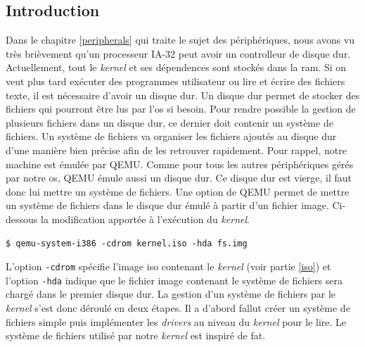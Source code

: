 
\subsection{Introduction}
Dans le chapitre \ref{peripherals} qui traite le sujet des périphériques, nous
avons vu très brièvement qu'un processeur \acrshort{IA-32} peut avoir un controlleur
de disque dur. Actuellement, tout le \textit{kernel} et ses dépendences sont
stockés dans la \acrshort{ram}. Si on veut plus tard exécuter des programmes utilisateur
ou lire et écrire des fichiers texte, il est nécessaire d'avoir un disque dur.
Un disque dur permet de stocker des fichiers qui pourront être lus par l'\acrshort{os}
si besoin. Pour rendre possible la gestion de plusieurs fichiers dans un disque
dur, ce dernier doit contenir un système de fichiers. Un système de fichiers va
organiser les fichiers ajoutés au disque dur d'une manière bien précise afin
de les retrouver rapidement. Pour rappel, notre machine est émulée par QEMU.
Comme pour tous les autres périphériques gérés par notre \acrshort{os}, QEMU
émule aussi un disque dur. Ce disque dur est vierge, il faut donc lui mettre
un système de fichiers. Une option de QEMU permet de mettre un système de fichiers
dans le disque dur émulé à partir d'un fichier image. Ci-dessous la modification
apportée à l'exécution du \textit{kernel}.

\begin{verbatim}
$ qemu-system-i386 -cdrom kernel.iso -hda fs.img
\end{verbatim}

L'option  \texttt{-cdrom} spécifie l'image \acrshort{iso} contenant
le \textit{kernel} (voir partie \ref{iso}) et l'option \texttt{-hda} indique
que le fichier image contenant le système de fichiers sera chargé dans le premier
disque dur. La gestion d'un système de fichiers par le \textit{kernel} s'est donc
déroulé en deux étapes. Il a d'abord fallut créer un système de fichiers simple
puis implémenter les \textit{drivers} au niveau du \textit{kernel} pour le lire.
Le système de fichiers utilisé par notre \textit{kernel} est inspiré de \acrshort{fat}. \\

